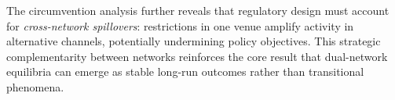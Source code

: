 The circumvention analysis further reveals that regulatory design must account 
for \textit{cross-network spillovers}: restrictions in one venue amplify 
activity in alternative channels, potentially undermining policy objectives. 
This strategic complementarity between networks reinforces the core result 
that dual-network equilibria can emerge as stable long-run outcomes rather 
than transitional phenomena.

